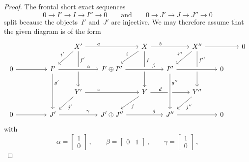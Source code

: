 \begin{proof}
  The frontal short exact sequences
  \[
    0 
    \to
    I'
    \to
    I
    \to
    I''
    \to
    0
    \qquad\text{and}\qquad
    0
    \to
    J'
    \to
    J
    \to
    J''
    \to
    0
  \]
  split because the objects~$I'$ and~$J'$ are injective.
  We may therefore assume that the given diagram is of the form
  \[
    \begin{tikzcd}[column sep = 1.8em]
        {}
      & {}
      & {}
      & X'
        \arrow{rr}[above, near start]{a}
        \arrow{dl}[above left]{i'}
        \arrow{dd}[right, near start]{f'}
      & {}
      & X
        \arrow{rr}[above, near start]{b}
        \arrow{dl}[above left]{i}
        \arrow{dd}[right, near start]{f}
      & {}
      & X''
        \arrow{rr}
        \arrow{dl}[above left]{i''}
        \arrow{dd}[right, near start]{f''}
      & {}
      & 0
      \\
        0
        \arrow{rr}
      & {}
      & I'
        \arrow{dd}[right, near start]{g'}
      & {}
      & I' \oplus I''
        \arrow[from=ll, crossing over, "\alpha", near end]
      & {}
      & I''
        \arrow[from=ll, crossing over, "\beta", near end]
      & {}
      & 0
        \arrow[from=ll, crossing over]
      & {}
      \\
        {}
      & {}
      & {}
      & Y'
        \arrow{rr}[above, near start]{c}
        \arrow{dl}[below right]{j'}
      & {}
      & Y
        \arrow{rr}[above, near start]{d}
        \arrow{dl}[below right]{j}
      & {}
      & Y''
        \arrow{dl}[below right]{j''}
      & {}
      & {}
      \\
        0
        \arrow{rr}
      & {}
      & J'
        \arrow{rr}[above, near end]{\gamma}
      & {}
      & J' \oplus J''
        \arrow{rr}[above, near end]{\delta}
      & {}
      & J''
        \arrow[from=uu, crossing over, "g''", near start]
        \arrow{rr}
      & {}
      & 0
      & {}
    \end{tikzcd}
  \]
  with
  \[
    \alpha
    =
    \begin{bmatrix}
      1 \\
      0
    \end{bmatrix} \,,
    \qquad
    \beta
    =
    \begin{bmatrix}
      0 & 1
    \end{bmatrix} \,,
    \qquad
    \gamma
    =
    \begin{bmatrix}
      1 \\
      0
    \end{bmatrix} \,,
\]
\end{proof}
